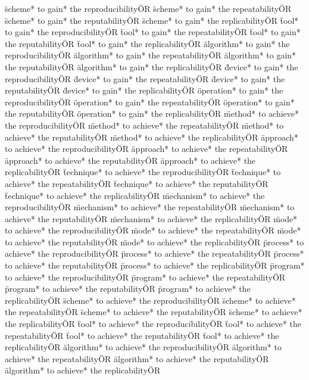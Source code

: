 \documentclass[
10pt, %
a4paper, %
oneside, %
headinclude,footinclude, %
BCOR5mm, %
]{scrartcl}
\begin{document}
\"scheme* to gain* the reproducibility\" OR \"scheme* to gain* the repeatability\" OR \"scheme* to gain* the reputability\" OR \"scheme* to gain* the replicability\" OR 
\"tool* to gain* the reproducibility\" OR \"tool* to gain* the repeatability\" OR \"tool* to gain* the reputability\" OR \"tool* to gain* the replicability\" OR 
\"algorithm* to gain* the reproducibility\" OR \"algorithm* to gain* the repeatability\" OR \"algorithm* to gain* the reputability\" OR \"algorithm* to gain* the replicability\" OR 
\"device* to gain* the reproducibility\" OR \"device* to gain* the repeatability\" OR \"device* to gain* the reputability\" OR \"device* to gain* the replicability\" OR 
\"operation* to gain* the reproducibility\" OR \"operation* to gain* the repeatability\" OR \"operation* to gain* the reputability\" OR \"operation* to gain* the replicability\" OR 
\"method* to achieve* the reproducibility\" OR \"method* to achieve* the repeatability\" OR \"method* to achieve* the reputability\" OR \"method* to achieve* the replicability\" OR 
\"approach* to achieve* the reproducibility\" OR \"approach* to achieve* the repeatability\" OR \"approach* to achieve* the reputability\" OR \"approach* to achieve* the replicability\" OR 
\"technique* to achieve* the reproducibility\" OR \"technique* to achieve* the repeatability\" OR \"technique* to achieve* the reputability\" OR \"technique* to achieve* the replicability\" OR 
\"mechanism* to achieve* the reproducibility\" OR \"mechanism* to achieve* the repeatability\" OR \"mechanism* to achieve* the reputability\" OR \"mechanism* to achieve* the replicability\" OR 
\"mode* to achieve* the reproducibility\" OR \"mode* to achieve* the repeatability\" OR \"mode* to achieve* the reputability\" OR \"mode* to achieve* the replicability\" OR 
\"process* to achieve* the reproducibility\" OR \"process* to achieve* the repeatability\" OR \"process* to achieve* the reputability\" OR \"process* to achieve* the replicability\" OR 
\"program* to achieve* the reproducibility\" OR \"program* to achieve* the repeatability\" OR \"program* to achieve* the reputability\" OR \"program* to achieve* the replicability\" OR 
\"scheme* to achieve* the reproducibility\" OR \"scheme* to achieve* the repeatability\" OR \"scheme* to achieve* the reputability\" OR \"scheme* to achieve* the replicability\" OR 
\"tool* to achieve* the reproducibility\" OR \"tool* to achieve* the repeatability\" OR \"tool* to achieve* the reputability\" OR \"tool* to achieve* the replicability\" OR 
\"algorithm* to achieve* the reproducibility\" OR \"algorithm* to achieve* the repeatability\" OR \"algorithm* to achieve* the reputability\" OR \"algorithm* to achieve* the replicability\" OR 
\end{document}
